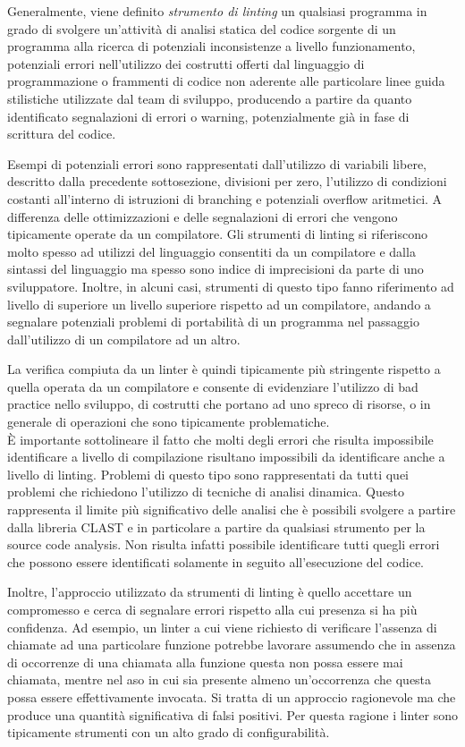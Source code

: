 Generalmente, viene definito \textit{strumento di linting} un qualsiasi
programma in grado di svolgere un'attività di analisi statica del codice
sorgente di un programma alla ricerca di potenziali inconsistenze a livello
funzionamento, potenziali errori nell'utilizzo dei costrutti offerti dal
linguaggio di programmazione o frammenti di codice non aderente alle particolare
linee guida stilistiche utilizzate dal team di sviluppo, producendo a partire da
quanto identificato segnalazioni di errori o warning, potenzialmente già in fase
di scrittura del codice.

Esempi di potenziali errori sono rappresentati dall'utilizzo di variabili
libere, descritto dalla precedente sottosezione, divisioni per zero, l'utilizzo
di condizioni costanti all'interno di istruzioni di branching e potenziali
overflow aritmetici. A differenza delle ottimizzazioni e delle segnalazioni di
errori che vengono tipicamente operate da un compilatore. Gli strumenti di
linting si riferiscono molto spesso ad utilizzi del linguaggio consentiti da un
compilatore e dalla sintassi del linguaggio ma spesso sono indice di
imprecisioni da parte di uno sviluppatore. Inoltre, in alcuni casi, strumenti di
questo tipo fanno riferimento ad livello di superiore un livello superiore
rispetto ad un compilatore, andando a segnalare potenziali problemi di
portabilità di un programma nel passaggio dall'utilizzo di un compilatore ad un
altro.

La verifica compiuta da un linter è quindi tipicamente più stringente rispetto a
quella operata da un compilatore e consente di evidenziare l'utilizzo di bad
practice nello sviluppo, di costrutti che portano ad uno spreco di risorse, o in
generale di operazioni che sono tipicamente problematiche.\\

È importante sottolineare il fatto che molti degli errori che risulta impossibile
identificare a livello di compilazione risultano impossibili da identificare
anche a livello di linting. Problemi di questo tipo sono rappresentati
da tutti quei problemi che richiedono l'utilizzo di tecniche di analisi
dinamica. Questo rappresenta il limite più significativo delle analisi che è
possibili svolgere a partire dalla libreria CLAST e in particolare a partire da
qualsiasi strumento per la source code analysis. Non risulta infatti possibile
identificare tutti quegli errori che possono essere identificati solamente in
seguito all'esecuzione del codice.

Inoltre, l'approccio utilizzato da strumenti di linting è quello accettare un
compromesso e cerca di segnalare errori rispetto alla cui presenza si ha più
confidenza. Ad esempio, un linter a cui viene richiesto di verificare l'assenza
di chiamate ad una particolare funzione potrebbe lavorare assumendo che in
assenza di occorrenze di una chiamata alla funzione questa non possa essere mai
chiamata, mentre nel aso in cui sia presente almeno un'occorrenza che questa
possa essere effettivamente invocata. Si tratta di un approccio ragionevole ma
che produce una quantità significativa di falsi positivi. Per questa ragione i
linter sono tipicamente strumenti con un alto grado di configurabilità.

